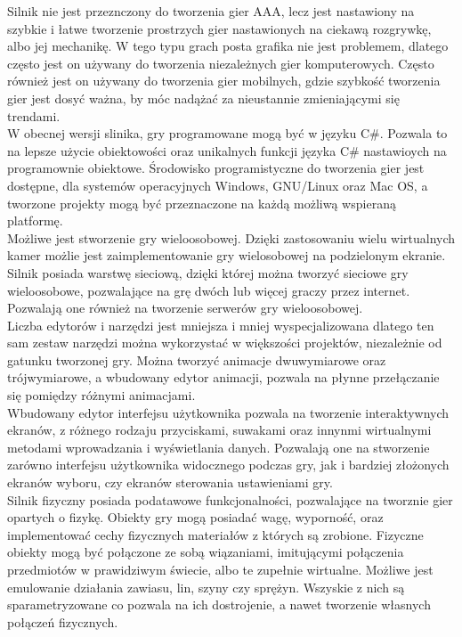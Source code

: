 \documentclass{article} %
\begin{document}
        Silnik nie jest przeznczony do tworzenia gier AAA, lecz jest nastawiony na szybkie i łatwe tworzenie prostrzych gier nastawionych na ciekawą rozgrywkę, albo jej mechanikę. W tego typu grach posta grafika nie jest problemem, dlatego często jest on używany do tworzenia niezależnych gier komputerowych. Często również jest on używany do tworzenia gier mobilnych, gdzie szybkość tworzenia gier jest dosyć ważna, by móc nadążać za nieustannie zmieniającymi się trendami.
        \\
        
        W obecnej wersji slinika, gry programowane mogą być w języku C\#. Pozwala to na lepsze użycie obiektowości oraz unikalnych funkcji języka C\# nastawioych na programownie obiektowe. Środowisko programistyczne do tworzenia gier jest dostępne, dla systemów operacyjnych Windows, GNU/Linux oraz Mac OS, a tworzone projekty mogą być przeznaczone na każdą możliwą wspieraną platformę.
        \\
        
        Możliwe jest stworzenie gry wieloosobowej. Dzięki zastosowaniu wielu wirtualnych kamer możlie jest zaimplementowanie gry wielosobowej na podzielonym ekranie. Silnik posiada warstwę sieciową, dzięki której można tworzyć sieciowe gry wieloosobowe, pozwalające na grę dwóch lub więcej graczy przez internet. Pozwalają one również na tworzenie serwerów gry wieloosobowej.
        \\
        
        Liczba edytorów i narzędzi jest mniejsza i mniej wyspecjalizowana dlatego ten sam zestaw narzędzi można wykorzystać w większości projektów, niezależnie od gatunku tworzonej gry. Można tworzyć animacje dwuwymiarowe oraz trójwymiarowe, a wbudowany edytor animacji, pozwala na płynne przełączanie się pomiędzy różnymi animacjami.
        \\
        
        Wbudowany edytor interfejsu użytkownika pozwala na tworzenie interaktywnych ekranów, z różnego rodzaju przyciskami, suwakami oraz innynmi wirtualnymi metodami wprowadzania i wyświetlania danych. Pozwalają one na stworzenie zarówno interfejsu użytkownika widocznego podczas gry, jak i bardziej złożonych ekranów wyboru, czy ekranów sterowania ustawieniami gry.
        \\
        
        Silnik fizyczny posiada podatawowe funkcjonalności, pozwalające na tworznie gier opartych o fizykę. Obiekty gry mogą posiadać wagę, wyporność, oraz implementować cechy fizycznych materiałów z których są zrobione. Fizyczne obiekty mogą być połączone ze sobą wiązaniami, imitującymi połączenia przedmiotów w prawidziwym świecie, albo te zupełnie wirtualne. Możliwe jest emulowanie działania zawiasu, lin, szyny czy sprężyn. Wszyskie z nich są sparametryzowane co pozwala na ich dostrojenie, a nawet tworzenie własnych połączeń fizycznych.
        \\
        
\end{document}
